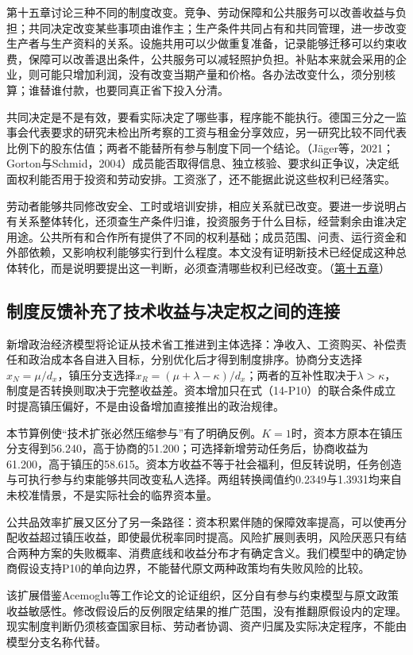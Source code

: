 \documentclass[UTF8,fontset=windows,12pt,a4paper,oneside,openany]{ctexbook}
\begin{document}
第十五章讨论三种不同的制度改变。竞争、劳动保障和公共服务可以改善收益与负担；共同决定改变某些事项由谁作主；生产条件共同占有和共同管理，进一步改变生产者与生产资料的关系。设施共用可以少做重复准备，记录能够迁移可以约束收费，保障可以改善退出条件，公共服务可以减轻照护负担。补贴本来就会采用的企业，则可能只增加利润，没有改变当期产量和价格。各办法改变什么，须分别核算；谁替谁付款，也要同真正省下投入分清。

共同决定是不是有效，要看实际决定了哪些事，程序能不能执行。德国三分之一监事会代表要求的研究未检出所考察的工资与租金分享效应，另一研究比较不同代表比例下的股东估值；两者不能替所有参与制度下同一个结论。（Jäger等，2021；Gorton与Schmid，2004）成员能否取得信息、独立核验、要求纠正争议，决定纸面权利能否用于投资和劳动安排。工资涨了，还不能据此说这些权利已经落实。

劳动者能够共同修改安全、工时或培训安排，相应关系就已改变。要进一步说明占有关系整体转化，还须查生产条件归谁，投资服务于什么目标，经营剩余由谁决定用途。公共所有和合作所有提供了不同的权利基础；成员范围、问责、运行资金和外部依赖，又影响权利能够实行到什么程度。本文没有证明新技术已经促成这种总体转化，而是说明要提出这一判断，必须查清哪些权利已经改变。（\hyperref[ch:15]{第十五章}）

\subsection{制度反馈补充了技术收益与决定权之间的连接}

新增政治经济模型将论证从技术省工推进到主体选择：净收入、工资购买、补偿责任和政治成本各自进入目标，分别优化后才得到制度排序。协商分支选择$x_N=\mu/d_x$，镇压分支选择$x_R=(\mu+\lambda-\kappa)/d_x$；两者的互补性取决于$\lambda>\kappa$，制度是否转换则取决于完整收益差。资本增加只在式（14-P10）的联合条件成立时提高镇压偏好，不是由设备增加直接推出的政治规律。

本节算例使“技术扩张必然压缩参与”有了明确反例。$K=1$时，资本方原本在镇压分支得到56.240，高于协商的51.200；可选择新增劳动任务后，协商收益为61.200，高于镇压的58.615。资本方收益不等于社会福利，但反转说明，任务创造与可执行参与约束能够共同改变私人选择。两组转换阈值约0.2349与1.3931均来自未校准情景，不是实际社会的临界资本量。

公共品效率扩展又区分了另一条路径：资本积累伴随的保障效率提高，可以使再分配收益超过镇压收益，即使最优税率同时提高。风险扩展则表明，风险厌恶只有结合两种方案的失败概率、消费底线和收益分布才有确定含义。我们模型中的确定协商假设支持P10的单向边界，不能替代原文两种政策均有失败风险的比较。

该扩展借鉴Acemoglu等工作论文的论证组织，区分自有参与约束模型与原文政策收益敏感性。修改假设后的反例限定结果的推广范围，没有推翻原假设内的定理。现实制度判断仍须核查国家目标、劳动者协调、资产归属及实际决定程序，不能由模型分支名称代替。
\end{document}

